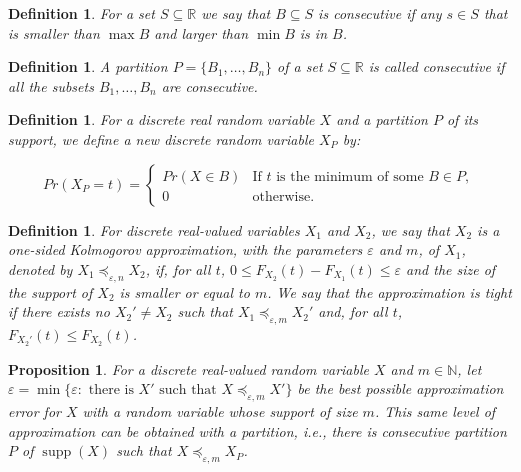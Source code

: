 \documentclass[review]{elsarticle}
\newtheorem{definition}[lemma]{Definition}
\newtheorem{proposition}[lemma]{Proposition}
\DeclareMathOperator{\supp}{supp}
\begin{document}
\begin{definition}\label{consecutive} For a set $S \subseteq \mathbb{R}$ we say that
$B \subseteq S$ is \emph{consecutive} if any $s\in S$ that is smaller than $\max B$ and larger than $\min B$ is in $B$.
\end{definition}

\begin{definition}\label{part_consecutive} A partition $P=\{B_1,\dots,B_n\}$ of a set $S \subseteq \mathbb{R}$ is called 
\emph{consecutive} if all the subsets $B_1 ,\dots,B_n$ are consecutive.
\end{definition}


\begin{definition}\label{partition}
	For a discrete real random variable $X$ and a partition $P$ of its support, we define a new discrete random variable $X_P$ by:
	
	$$Pr(X_P = t) = \begin{cases} 
	Pr(X\in B) & \text{If $t$ is the minimum of some } B \in P, \\
	0      & \text{otherwise.}
	\end{cases}$$
\end{definition}


\begin{definition}
	For discrete real-valued variables $X_1$ and $X_2$, we say that $X_2$ is a one-sided Kolmogorov approximation, with the parameters $\varepsilon$ and $m$, of $X_1$, denoted by 
	$X_1 \preceq_{\varepsilon,n} X_2$, if, for all $t$, $0 \leq   F_{X_2}(t)-F_{X_1}(t) \leq \varepsilon$ and the size of the support of $X_2$ is smaller or equal to $m$. We say that the approximation is tight if there exists no  $X_2' \neq X_2$ such that $X_1 \preceq_{\varepsilon,m} X_2'$ and, for all $t$, $F_{X_2'}(t) \leq F_{X_2}(t)$. 
\end{definition}

\begin{proposition}
	For a discrete real-valued random variable $X$ and $m \in \mathbb{N}$, 
	let $\varepsilon = \min\{\varepsilon \colon \text{ there is $X'$ such that $X \preceq_{\varepsilon,m} X'$}\}$ be the best possible approximation error for $X$ with a random variable whose support of size $m$. This same level of approximation can be obtained with a partition, i.e., there is consecutive partition $P$ of $\supp(X)$ such that $X \preceq_{\varepsilon,m} X_P$.
	
\end{proposition}
\end{document}
